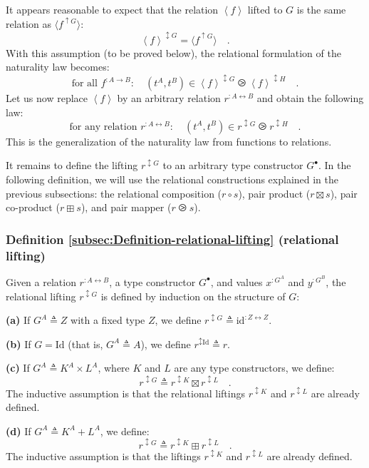 It appears reasonable to expect that the relation $\left<f\right>$
lifted to $G$ is the same relation as $\langle f^{\uparrow G}\rangle$:
\[
\left<f\right>^{\updownarrow G}=\langle f^{\uparrow G}\rangle\quad.
\]
With this assumption (to be proved below), the relational formulation
of the naturality law becomes:
\[
\text{for all }f^{:A\rightarrow B}:\quad(t^{A},t^{B})\in\left<f\right>^{\updownarrow G}\ogreaterthan\left<f\right>^{\updownarrow H}\quad.
\]
Let us now replace $\left<f\right>$ by an arbitrary relation $r^{:A\leftrightarrow B}$
and obtain the following law:
\[
\text{for any relation }r^{:A\leftrightarrow B}:\quad(t^{A},t^{B})\in r^{\updownarrow G}\ogreaterthan r^{\updownarrow H}\quad.
\]
This is the generalization of the naturality law from functions to
relations. 

It remains to define the lifting $r^{\updownarrow G}$ to an arbitrary
type constructor $G^{\bullet}$. In the following definition, we will
use the relational constructions explained in the previous subsections:
the relational composition ($r\circ s$), pair product ($r\boxtimes s$),
pair co-product ($r\boxplus s$), and pair mapper ($r\ogreaterthan s$).

\subsubsection{Definition \label{subsec:Definition-relational-lifting}\ref{subsec:Definition-relational-lifting}
(relational lifting)}

Given a relation $r^{:A\leftrightarrow B}$, a type constructor $G^{\bullet}$,
and values $x^{:G^{A}}$ and $y^{:G^{B}}$, the relational lifting
$r^{\updownarrow G}$ is defined by induction on the structure of
$G$:

\textbf{(a)} If $G^{A}\triangleq Z$ with a fixed type $Z$, we define
$r^{\updownarrow G}\triangleq\text{id}^{:Z\leftrightarrow Z}$.

\textbf{(b)} If $G=\text{Id}$ (that is, $G^{A}\triangleq A$), we
define $r^{\updownarrow\text{Id}}\triangleq r$. 

\textbf{(c)} If $G^{A}\triangleq K^{A}\times L^{A}$, where $K$ and
$L$ are any type constructors, we define: 
\[
r^{\updownarrow G}\triangleq r^{\updownarrow K}\boxtimes r^{\updownarrow L}\quad.
\]
The inductive assumption is that the relational liftings $r^{\updownarrow K}$
and $r^{\updownarrow L}$ are already defined.

\textbf{(d)} If $G^{A}\triangleq K^{A}+L^{A}$, we define: 
\[
r^{\updownarrow G}\triangleq r^{\updownarrow K}\boxplus r^{\updownarrow L}\quad.
\]
The inductive assumption is that the liftings $r^{\updownarrow K}$
and $r^{\updownarrow L}$ are already defined.

